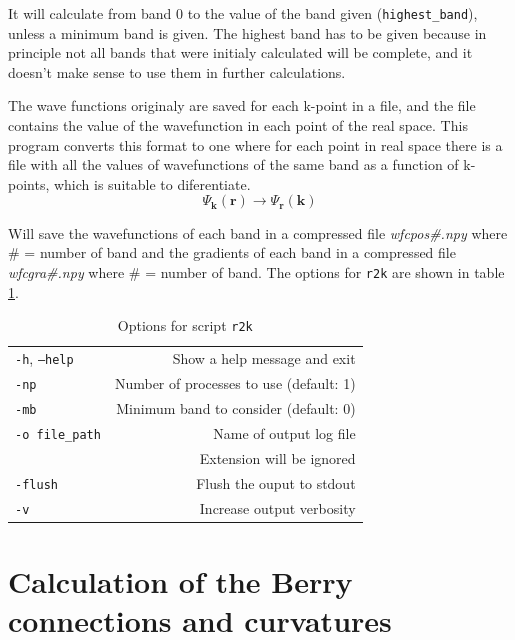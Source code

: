 \documentclass[a4paper,12pt]{report}
\begin{document}
It will calculate from band 0 to the value of the band given (\texttt{highest\_band}),
unless a minimum band is given.
The highest band has to be given because in principle not all bands that were initialy calculated will
be complete, and it doesn't make sense to use them in further calculations.

The wave functions originaly are saved for each k-point in a file, and the file contains the value of the wavefunction in each
point of the real space.
This program converts this format to one where for each point in real space there is a file with all the values of wavefunctions
of the same band as a function of k-points, which is suitable to diferentiate.
\begin{equation*}
 \Psi_{\pmb{k}}(\pmb{r}) \rightarrow \Psi_{\pmb{r}}(\pmb{k})
\end{equation*}

Will save the wavefunctions of each band in a compressed file \emph{wfcpos\#.npy} where \# = number of band
and the gradients of each band in a compressed file \emph{wfcgra\#.npy} where \# = number of band.
The options for \texttt{r2k} are shown in table \ref{tab:options_r2k}.

\begin{table}[h]
 \centering
 \caption{Options for script \texttt{r2k}}\label{tab:options_r2k}
\begin{tabular}[]{lr}
\hline
  \texttt{-h}, \texttt{--help}  &\hspace*{2cm} Show a help message and exit \\
  \texttt{-np}                  & Number of processes to use (default: 1) \\
  \texttt{-mb}                  & Minimum band to consider (default: 0) \\
  \texttt{-o file\_path}        & Name of output log file\\
                                & Extension will be ignored\\
  \texttt{-flush}               & Flush the ouput to stdout \\
  \texttt{-v}                   & Increase output verbosity \\
  \hline
\end{tabular}
\end{table}



\section{Calculation of the Berry connections and curvatures}
\end{document}
